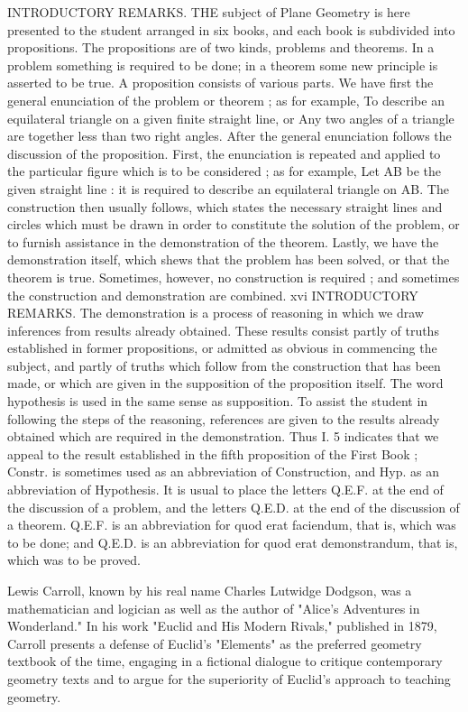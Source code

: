 INTRODUCTORY REMARKS.
THE subject of Plane Geometry is here presented to the
student arranged in six books, and each book is subdivided
into propositions. The propositions are of two kinds, problems and theorems. In a problem something is required
to be done; in a theorem some new principle is asserted to be true.
A proposition consists of various parts. We have first
the general enunciation of the problem or theorem ; as for
example, To describe an equilateral triangle on a given
finite straight line, or Any two angles of a triangle are
together less than two right angles. After the general
enunciation follows the discussion of the proposition. First,
the enunciation is repeated and applied to the particular
figure which is to be considered ; as for example, Let AB
be the given straight line : it is required to describe an
equilateral triangle on AB. The construction then usually
follows, which states the necessary straight lines and circles
which must be drawn in order to constitute the solution of
the problem, or to furnish assistance in the demonstration
of the theorem. Lastly, we have the demonstration itself,
which shews that the problem has been solved, or that the
theorem is true.
Sometimes, however, no construction is required ; and
sometimes the construction and demonstration are combined.
xvi INTRODUCTORY REMARKS.
The demonstration is a process of reasoning in which
we draw inferences from results already obtained. These
results consist partly of truths established in former propositions, or admitted as obvious in commencing the subject,
and partly of truths which follow from the construction
that has been made, or which are given in the supposition
of the proposition itself. The word hypothesis is used in
the same sense as supposition.
To assist the student in following the steps of the
reasoning, references are given to the results already obtained which are required in the demonstration. Thus I. 5
indicates that we appeal to the result established in the
fifth proposition of the First Book ; Constr. is sometimes
used as an abbreviation of Construction, and Hyp. as an
abbreviation of Hypothesis.
It is usual to place the letters Q.E.F. at the end of the
discussion of a problem, and the letters Q.E.D. at the end of
the discussion of a theorem. Q.E.F. is an abbreviation for
quod erat faciendum, that is, which was to be done; and
Q.E.D. is an abbreviation for quod erat demonstrandum,
that is, which was to be proved.


Lewis Carroll, known by his real name Charles Lutwidge Dodgson, was a mathematician and logician as well as the author of "Alice's Adventures in Wonderland." In his work "Euclid and His Modern Rivals," published in 1879, Carroll presents a defense of Euclid's "Elements" as the preferred geometry textbook of the time, engaging in a fictional dialogue to critique contemporary geometry texts and to argue for the superiority of Euclid's approach to teaching geometry.

